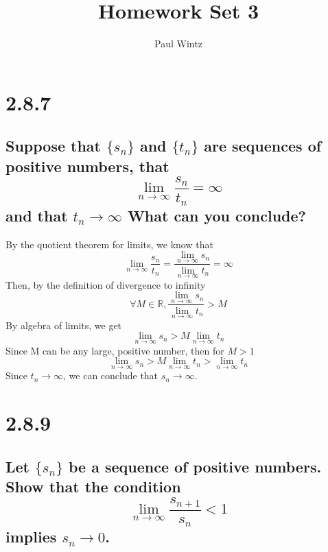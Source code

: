 \documentclass[11pt]{article}
\begin{document}
	\author{Paul Wintz}
	\title{Homework Set 3}
	\maketitle
	
	\newcommand{\limittoinfy}[2]{\lim_{#1 \to \infty}#2}
	\newcommand{\limittoinfyn}[1]{\lim_{n \to \infty}#1}
	\def \limsup {\lim_{n \to \infty}sup}
	\def \liminf {\lim_{n \to \infty}inf}
	\newcommand{\sumto}[1]{\sum_{n=1}^{#1}}
	\def \sumtoinfy {\sum_{n=1}^{\infty}}

	\newcommand{\set}[1]{\{#1\}}
	\def \sn {s_n}
	\def \tn {t_n}
	\def \xn {x_n}
	\def \an {a_n}
	\def \bn {b_n}
	
	\def \snplusone{s_{n+1}}
	\def \snfrac {\frac{\snplusone}{\sn}}
	
	\def \nfrac{\frac{1}{n}}
	\def \novernplusone {\frac{n}{n+1}}
	
	\section*{2.8.7}
	\subsection*{Suppose that $\set{\sn}$ and $\set{\tn}$ are sequences of positive numbers, that $$\limittoinfyn{\frac{\sn}{\tn}} = \infty$$ and that $\tn \rightarrow \infty$ What can you conclude?}
	
	By the quotient theorem for limits, we know that $$\limittoinfyn{\frac{\sn}{\tn}} = \frac{\limittoinfyn{\sn}}{\limittoinfyn{\tn}} = \infty$$
	Then, by the definition of divergence to infinity
	$$\forall M \in \mathbb{R}, \frac{\limittoinfyn{\sn}}{\limittoinfyn{\tn}} >M$$
	By algebra of limits, we get
	$$\limittoinfyn{\sn} > M \limittoinfyn{\tn}$$	
	Since M can be any large, positive number, then for $M > 1$
	$$\limittoinfyn{\sn} > M \limittoinfyn{\tn} > \limittoinfyn{\tn}$$
	Since $\tn \rightarrow \infty$, we can conclude that $\sn \rightarrow \infty$.
	
	\section*{2.8.9}
	\subsection*{
		Let $\set{\sn}$ be a sequence of positive numbers. Show that the condition $$\limittoinfyn{\snfrac{}} < 1$$ implies $\sn \rightarrow 0$.}
	
\end{document}
